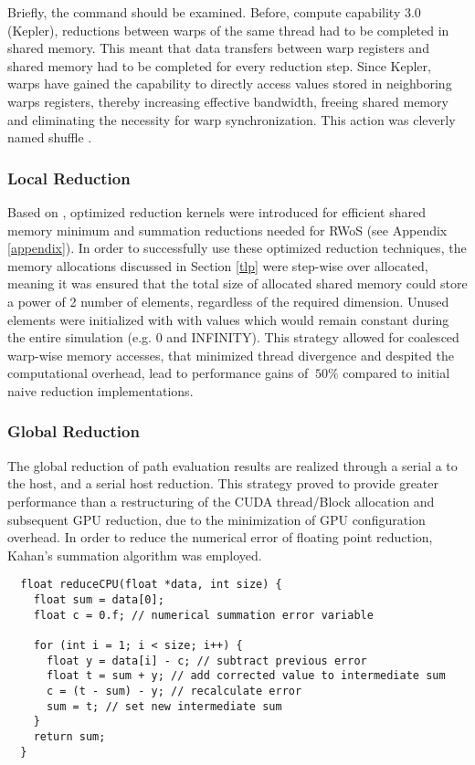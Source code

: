 Briefly, the  command should be examined. Before, compute capability
3.0 (Kepler), reductions between warps of the same thread had to be completed in
shared memory.  This meant that data transfers between warp registers and shared
memory had to be completed for every reduction step.  Since Kepler, warps have gained
the capability to directly access values stored in neighboring warps registers,
thereby increasing effective bandwidth, freeing shared memory and eliminating the
necessity for warp synchronization. This action was cleverly named shuffle \cite{shuffle}.
\subsubsection{Local Reduction}\label{localRed}
Based on \cite{harris}, optimized reduction kernels were introduced for efficient
shared memory minimum and summation reductions needed for \Gls{RWoS} (see Appendix \ref{appendix}).
In order to successfully use these optimized reduction techniques, the memory allocations
discussed in Section \ref{tlp} were step-wise over allocated, meaning it was ensured that
the total size of allocated shared memory could store a power of 2 number of elements,
regardless of the required dimension.  Unused elements were initialized with with
values which would remain constant during the entire simulation (e.g. 0 and INFINITY).
This strategy allowed for coalesced warp-wise memory accesses, that minimized
thread divergence and despited the computational overhead, lead to performance gains
of $~50\%$ compared to initial naive reduction implementations.
\subsubsection{Global Reduction}
The global reduction of path evaluation results are realized through a serial
a  to the host, and a serial host reduction.  This strategy
proved to provide greater performance than a restructuring of the CUDA thread/Block
allocation and subsequent GPU reduction, due to the minimization of GPU configuration
overhead.  In order to reduce the numerical error of floating point reduction,
Kahan's summation algorithm was employed.
\begin{verbatim}
  float reduceCPU(float *data, int size) {
    float sum = data[0];
    float c = 0.f; // numerical summation error variable

    for (int i = 1; i < size; i++) {
      float y = data[i] - c; // subtract previous error
      float t = sum + y; // add corrected value to intermediate sum
      c = (t - sum) - y; // recalculate error
      sum = t; // set new intermediate sum
    }
    return sum;
  }
\end{verbatim}


